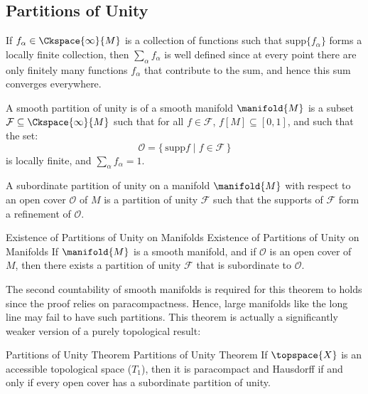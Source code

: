     \subsection{Partitions of Unity}
        If $f_{\alpha}\in\Ckspace{\infty}{M}$ is a collection of functions
        such that $\textrm{supp}\{f_{\alpha}\}$ forms a locally finite
        collection, then $\sum_{\alpha}f_{\alpha}$ is well defined since
        at every point there are only finitely many functions $f_{\alpha}$
        that contribute to the sum, and hence this sum converges everywhere.
        \begin{definition}
            A smooth partition of unity is of a smooth manifold
            $\manifold{M}$ is a subset
            $\mathcal{F}\subseteq\Ckspace{\infty}{M}$ such that for all
            $f\in\mathcal{F}$, $f[M]\subseteq[0,1]$, and such that the set:
            \begin{equation}
                \mathcal{O}=\{\,\textrm{supp}{f}\;|\;f\in\mathcal{F}\,\}
            \end{equation}
            is locally finite, and $\sum_{\alpha}f_{\alpha}=1$.
        \end{definition}
        \begin{definition}
            A subordinate partition of unity on a manifold $\manifold{M}$
            with respect to an open cover $\mathcal{O}$ of $M$ is a
            partition of unity $\mathcal{F}$ such that the supports of
            $\mathcal{F}$ form a refinement of $\mathcal{O}$.
        \end{definition}
        \begin{ftheorem}{Existence of Partitions of Unity on Manifolds}
                        {Existence of Partitions of Unity on Manifolds}
            If $\manifold{M}$ is a smooth manifold, and if $\mathcal{O}$ is
            an open cover of $M$, then there exists a partition of unity
            $\mathcal{F}$ that is subordinate to $\mathcal{O}$.
        \end{ftheorem}
        The second countability of smooth manifolds is required for this
        theorem to holds since the proof relies on paracompactness. Hence,
        large manifolds like the long line may fail to have such partitions.
        This theorem is actually a significantly weaker version of a purely
        topological result:
        \begin{ftheorem}{Partitions of Unity Theorem}
                        {Partitions of Unity Theorem}
            If $\topspace{X}$ is an accessible topological space ($T_{1}$),
            then it is paracompact and Hausdorff if and only if every open
            cover has a subordinate partition of unity.
        \end{ftheorem}
